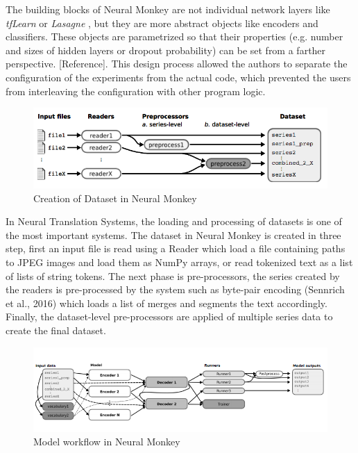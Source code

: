 The building blocks of Neural Monkey are not individual network layers like \textit{tfLearn} or \textit{Lasagne} , but they are more abstract objects like encoders and classifiers. These objects are parametrized so that their properties (e.g. number and sizes of hidden layers or dropout probability) can be set from a farther perspective. [Reference]. This design process allowed the authors to separate the configuration of the experiments from the actual code, which prevented the users from interleaving the configuration with other program logic. 

\begin{figure}
\includegraphics[width=\textwidth]{figures/nmonkey2.png}
\caption{ Creation of Dataset in Neural Monkey} \label{fignm2}
\end{figure}

In Neural Translation Systems, the loading and processing of datasets is one of the most important systems. The dataset in Neural Monkey is created in three step, first an input file is read using a Reader which load a file containing paths to JPEG images and load them as NumPy arrays, or read tokenized text as a list of lists of string tokens. The next phase is pre-processors, the series created by the readers is pre-processed by the system such as byte-pair encoding (Sennrich et al., 2016) which loads a list of merges and segments the text accordingly. Finally, the dataset-level pre-processors are applied of multiple series data to create the final dataset. 

\begin{figure}
\includegraphics[width=\textwidth]{figures/nmonkey1.png}
\caption{ Model workflow in Neural Monkey} \label{fignm1}
\end{figure}


